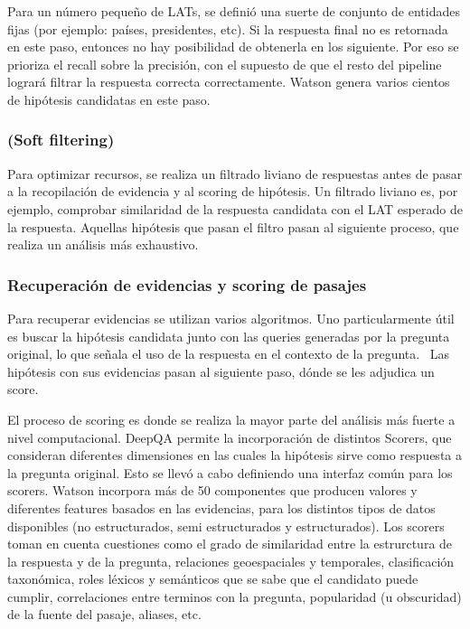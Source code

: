 Para un número pequeño de LATs, se definió una suerte de conjunto
de entidades fijas (por ejemplo: países, presidentes, etc). Si la
respuesta final no es retornada en este paso, entonces no hay
posibilidad de obtenerla en los siguiente. Por eso se prioriza el
recall sobre la precisión, con el supuesto de que el resto del
pipeline logrará filtrar la respuesta correcta correctamente. Watson
genera varios cientos de hipótesis candidatas en este paso.


\bigskip

\subsubsection*{(Soft filtering)}

Para optimizar recursos, se realiza un filtrado liviano de respuestas
antes de pasar a la recopilación de evidencia y al scoring de
hipótesis. Un filtrado liviano es, por ejemplo, comprobar similaridad
de la respuesta candidata con el LAT esperado de la respuesta. Aquellas
hipótesis que pasan el filtro pasan al siguiente proceso, que realiza
un análisis más exhaustivo.


\bigskip

\subsubsection{Recuperación de evidencias y scoring de pasajes}

Para recuperar evidencias se utilizan varios algoritmos. Uno
particularmente útil es buscar la hipótesis candidata junto con las
queries generadas por la pregunta original, lo que señala el uso de
la respuesta en el contexto de la pregunta. \ Las hipótesis con sus
evidencias pasan al siguiente paso, dónde se les adjudica un score. 

El proceso de scoring es donde se realiza la mayor parte del análisis
más fuerte a nivel computacional. DeepQA permite la incorporación
de distintos Scorers, que consideran diferentes dimensiones en las
cuales la hipótesis sirve como respuesta a la pregunta original. Esto
se llevó a cabo definiendo una interfaz común para los scorers.
Watson incorpora más de 50 componentes que producen valores y
diferentes features basados en las evidencias, para los distintos tipos
de datos disponibles (no estructurados, semi estructurados y
estructurados). Los scorers toman en cuenta cuestiones como el grado de
similaridad entre la estrurctura de la respuesta y de la pregunta,
relaciones geoespaciales y temporales, clasificación taxonómica,
roles léxicos y semánticos que se sabe que el candidato puede
cumplir, correlaciones entre terminos con la pregunta, popularidad (u
obscuridad) de la fuente del pasaje, aliases, etc.

